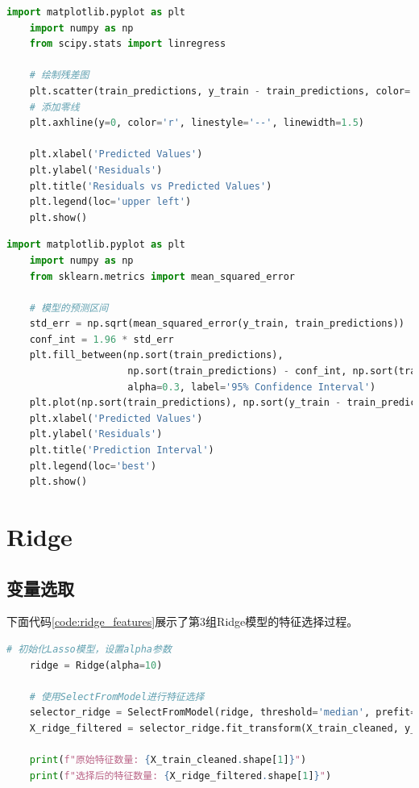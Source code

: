 \documentclass[
    report,     %
    oneside,    %
    UTF8,       %
    zihao=-4    %
]{config} %
\begin{document}
\begin{lstlisting}[label=code:lasso_residual, language=Python, caption=Lasso模型残差可视化图\ref{fig:lasso_residual}补充代码]
    import matplotlib.pyplot as plt
    import numpy as np
    from scipy.stats import linregress

    # 绘制残差图
    plt.scatter(train_predictions, y_train - train_predictions, color='blue',alpha=0.4, label='Residuals')
    # 添加零线
    plt.axhline(y=0, color='r', linestyle='--', linewidth=1.5)

    plt.xlabel('Predicted Values')
    plt.ylabel('Residuals')
    plt.title('Residuals vs Predicted Values')
    plt.legend(loc='upper left')
    plt.show()
\end{lstlisting}

\begin{lstlisting}[label=code:lasso_residual_interval, language=Python, caption=Lasso模型残差与95\%置信区间可视化图\ref{fig:lasso_residual_interval}补充代码]
    import matplotlib.pyplot as plt
    import numpy as np
    from sklearn.metrics import mean_squared_error
    
    # 模型的预测区间
    std_err = np.sqrt(mean_squared_error(y_train, train_predictions))
    conf_int = 1.96 * std_err
    plt.fill_between(np.sort(train_predictions), 
                     np.sort(train_predictions) - conf_int, np.sort(train_predictions) + conf_int, color='gray', 
                     alpha=0.3, label='95% Confidence Interval')
    plt.plot(np.sort(train_predictions), np.sort(y_train - train_predictions), color='blue', label='Residuals')
    plt.xlabel('Predicted Values')
    plt.ylabel('Residuals')
    plt.title('Prediction Interval')
    plt.legend(loc='best')
    plt.show()
\end{lstlisting}

\section{Ridge}
\subsection{变量选取}
下面代码\ref{code:ridge_features}展示了第3组Ridge模型的特征选择过程。
\begin{lstlisting}[label=code:ridge_features, language=Python, caption=Ridge模型特征选取]
    # 初始化Lasso模型，设置alpha参数  
    ridge = Ridge(alpha=10)  
      
    # 使用SelectFromModel进行特征选择  
    selector_ridge = SelectFromModel(ridge, threshold='median', prefit=False)  
    X_ridge_filtered = selector_ridge.fit_transform(X_train_cleaned, y_train)  
      
    print(f"原始特征数量: {X_train_cleaned.shape[1]}")  
    print(f"选择后的特征数量: {X_ridge_filtered.shape[1]}")
\end{lstlisting}
\end{document}
